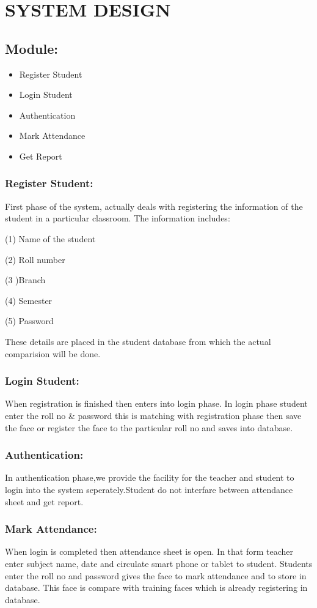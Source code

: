 \chapter{SYSTEM DESIGN}

\section{Module: }
\begin{itemize}
\item Register Student
\item Login Student
\item Authentication
\item Mark Attendance
\item Get Report
\end{itemize}

\subsection{Register Student: }
 First phase of the system, actually deals with registering the information of the student in a particular classroom. The information includes:

(1) Name of the student 

(2) Roll number 

(3 )Branch

(4) Semester

(5) Password

These details are placed in the student database from which the actual comparision will be done. 

\subsection{Login Student: }
When registration is finished then enters into login phase. In login phase student enter the roll no \& password this is matching with registration phase then save the face or register the face to the particular roll no and saves into database.

\subsection{Authentication: }
In authentication phase,we provide the facility for the teacher and student to  login into the system seperately.Student do not interfare between attendance sheet and get report.

\subsection{Mark Attendance: }
When login is completed then attendance sheet is open. In that form teacher enter subject name, date  and circulate smart phone or tablet to student. Students enter the roll no and password gives the face to mark attendance and to store in database. This face is compare with training faces which is already registering in database.  

